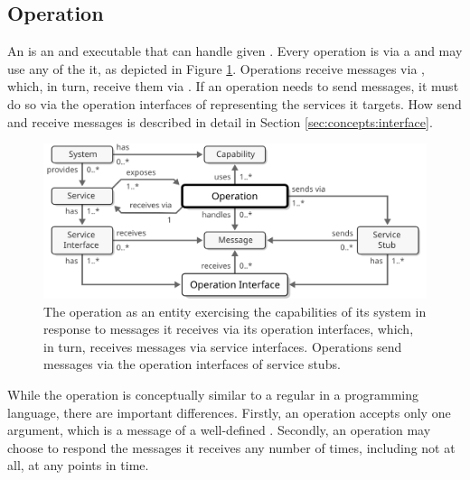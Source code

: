 \subsection{Operation}
\label{sec:concepts:operation}

An  is an  and executable  that can handle given .
Every operation is  via a  and may use any  of the   it, as depicted in Figure \ref{fig:operation}.
Operations receive messages via , which, in turn, receive them via .
If an operation needs to send messages, it must do so via the operation interfaces of  representing the services it targets.
How  send and receive messages is described in detail in Section \ref{sec:concepts:interface}.

\begin{figure}[ht!]
  \centering
  \includegraphics[scale=0.9]{figures/operation}
  \caption{
    The operation as an entity exercising the capabilities of its system in response to messages it receives via its operation interfaces, which, in turn, receives messages via service interfaces.
    Operations send messages via the operation interfaces of service stubs.
  }
  \label{fig:operation}
\end{figure}

While the operation is conceptually similar to a regular  in a programming language, there are important differences.
Firstly, an operation accepts only one argument, which is a message of a well-defined .
Secondly, an operation may choose to respond the messages it receives any number of times, including not at all, at any points in time.


